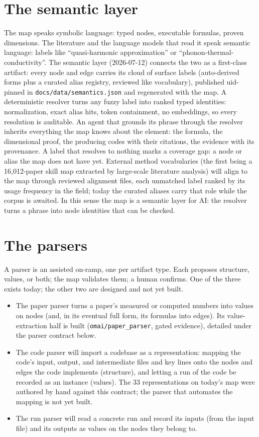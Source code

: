 \documentclass[11pt,a4paper]{article}
\begin{document}
\section{The semantic layer}

The map speaks symbolic language: typed nodes, executable formulas, proven
dimensions. The literature and the language models that read it speak semantic
language: labels like ``quasi-harmonic approximation'' or
``phonon-thermal-conductivity''. The semantic layer (2026-07-12) connects the
two as a first-class artifact: every node and edge carries its cloud of surface
labels (auto-derived forms plus a curated alias registry, reviewed like
vocabulary), published uid-pinned in \texttt{docs/data/semantics.json} and
regenerated with the map. A deterministic resolver turns any fuzzy label into
ranked typed identities: normalization, exact alias hits, token containment,
no embeddings, so every resolution is auditable. An agent that grounds its
phrase through the resolver inherits everything the map knows about the
element: the formula, the dimensional proof, the producing codes with their
citations, the evidence with its provenance. A label that resolves to nothing
marks a coverage gap: a node or alias the map does not have yet. External method
vocabularies (the first being a 16,012-paper skill map extracted by
large-scale literature analysis) will align to the map through reviewed
alignment files, each unmatched label ranked by its usage frequency in the
field; today the curated aliases carry that role while the corpus is awaited. In
this sense the map is a semantic layer for AI: the resolver turns a phrase
into node identities that can be checked.

\section{The parsers}

A parser is an assisted on-ramp, one per artifact type. Each proposes
structure, values, or both; the map validates them; a human confirms. One of the
three exists today; the other two are designed and not yet built.

\begin{itemize}[leftmargin=2em]
  \item The paper parser turns a paper's measured or computed numbers into values
  on nodes (and, in its eventual full form, its formulas into edges). Its
  value-extraction half is built (\texttt{omai/paper\_parser}, gated evidence),
  detailed under the parser contract below.
  \item The code parser will import a codebase as a representation: mapping the
  code's input, output, and intermediate files and key lines onto the nodes and
  edges the code implements (structure), and letting a run of the code be recorded
  as an instance (values). The 33 representations on today's map were authored by
  hand against this contract; the parser that automates the mapping is not yet
  built.
  \item The run parser will read a concrete run and record its inputs (from the
  input file) and its outputs as values on the nodes they belong to.
\end{itemize}
\end{document}
